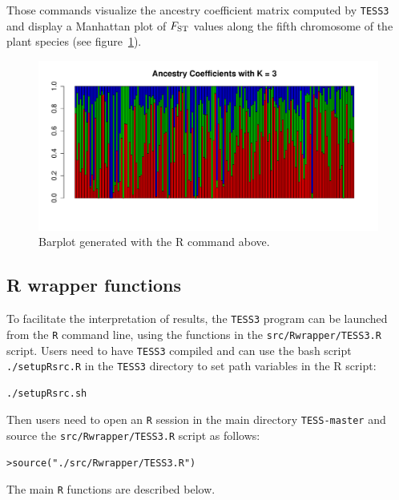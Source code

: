 \documentclass[10pt,a4paper]{article}
\begin{document}
Those commands visualize the ancestry coefficient matrix computed by {\tt TESS3} and display a Manhattan plot of $F_{\rm ST}$ values along the fifth chromosome of the plant species (see figure~\ref{fig:bar}).


\begin{figure}[h!]\centering
\includegraphics[width=\linewidth]{barplot.pdf}
\caption{Barplot generated with the R command above.}\label{fig:bar}
\end{figure} 

\subsection{R wrapper functions}
To facilitate the interpretation of results, the {\tt TESS3} program can be launched from the {\tt R} command line, using the functions in the  \verb|src/Rwrapper/TESS3.R| script. Users need to have {\tt TESS3} compiled and can use the bash script \verb|./setupRsrc.R| in the {\tt TESS3} directory to set path variables in the R script:
\begin{Verbatim}[frame=single]
./setupRsrc.sh
\end{Verbatim}
Then users need to open an {\tt R} session in the main directory {\tt TESS-master} and source the \verb|src/Rwrapper/TESS3.R| script as follows: 
\begin{Verbatim}[frame=single]
>source("./src/Rwrapper/TESS3.R")
\end{Verbatim}
The main {\tt R} functions are described below.
\end{document}
